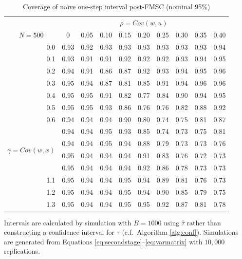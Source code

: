 \documentclass[12pt]{article}
\theoremstyle{definition}
\begin{document}
%
\begin{table}[!tbp]
\caption{Coverage of na\"{i}ve one-step interval post-FMSC (nominal 95\%)}
\label{tab:FMSCnaive}
\small
 \begin{center}
 \begin{tabular}{r|rrrrrrrrr}\hline\hline
&\multicolumn{9}{c}{$\rho = Cov(w,u)$}\\
\multicolumn{1}{c|}{$N=500$}&\multicolumn{1}{c}{0}&\multicolumn{1}{c}{0.05}&\multicolumn{1}{c}{0.10}&\multicolumn{1}{c}{0.15}&\multicolumn{1}{c}{0.20}&\multicolumn{1}{c}{0.25}&\multicolumn{1}{c}{0.30}&\multicolumn{1}{c}{0.35}&\multicolumn{1}{c}{0.40}\tabularnewline
\hline
0.0&0.93&0.92&0.93&0.93&0.93&0.93&0.93&0.93&0.94\tabularnewline
0.1&0.93&0.91&0.91&0.92&0.92&0.92&0.93&0.94&0.95\tabularnewline
0.2&0.94&0.91&0.86&0.87&0.92&0.93&0.94&0.95&0.96\tabularnewline
0.3&0.95&0.94&0.87&0.81&0.85&0.91&0.94&0.96&0.96\tabularnewline
0.4&0.95&0.95&0.91&0.82&0.77&0.84&0.90&0.94&0.95\tabularnewline
0.5&0.95&0.95&0.93&0.86&0.76&0.76&0.82&0.88&0.92\tabularnewline
0.6&0.94&0.94&0.94&0.90&0.80&0.74&0.75&0.81&0.87\tabularnewline
\multirow{4}{5mm}{\begin{sideways}\parbox{1mm}{$\gamma\;$=$\;Cov(w,x)$}\end{sideways}}
0.7&0.94&0.94&0.95&0.93&0.85&0.74&0.73&0.75&0.81\tabularnewline
0.8&0.94&0.94&0.95&0.94&0.88&0.79&0.73&0.73&0.76\tabularnewline
0.9&0.95&0.94&0.94&0.94&0.91&0.83&0.76&0.72&0.73\tabularnewline
1.0&0.95&0.94&0.94&0.94&0.92&0.86&0.78&0.73&0.73\tabularnewline
1.1&0.95&0.94&0.94&0.95&0.94&0.89&0.81&0.76&0.73\tabularnewline
1.2&0.95&0.94&0.94&0.95&0.94&0.90&0.85&0.79&0.75\tabularnewline
1.3&0.95&0.94&0.94&0.95&0.95&0.92&0.87&0.81&0.78\tabularnewline
\hline
\end{tabular}
\end{center}
\footnotesize
	\begin{tablenotes}
		\item Intervals are calculated by simulation with $B=1000$ using $\widehat{\tau}$ rather than constructing a confidence interval for $\tau$ (c.f.\ Algorithm \ref{alg:conf}). Simulations are generated from Equations \ref{eq:secondstage}--\ref{eq:varmatrix} with $10,000$ replications.
	\end{tablenotes}
\end{table}
\end{document}
